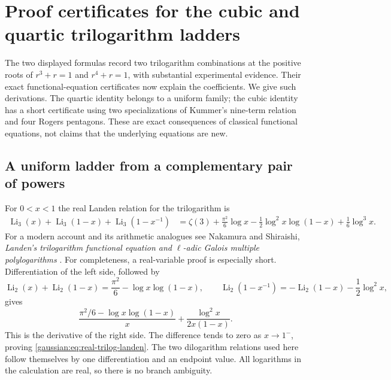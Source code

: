 
\section{Proof certificates for the cubic and quartic trilogarithm ladders}
\label{gaussian:sec:proved-small-ladders}

The two displayed formulas record two trilogarithm combinations
at the positive roots of $r^3+r=1$ and $r^4+r=1$, with substantial experimental evidence. Their exact functional-equation
certificates now explain the coefficients.
We give such derivations. The quartic identity belongs to a uniform
family; the cubic identity has a short certificate using two
specializations of Kummer's nine-term relation and four Rogers pentagons.
These are exact consequences of classical functional equations, not
claims that the underlying equations are new.

\subsection{A uniform ladder from a complementary pair of powers}

For $0<x<1$ the real Landen relation for the trilogarithm is
\begin{align}
\operatorname{Li}_3(x)+\operatorname{Li}_3(1-x)
 +\operatorname{Li}_3(1-x^{-1})
 &=\zeta(3)+\frac{\pi^2}{6}\log x
 -\frac12\log^2x\log(1-x)+\frac16\log^3x.
\label{gaussian:eq:real-trilog-landen}
\end{align}
For a modern account and its arithmetic analogues see
Nakamura and Shiraishi, \emph{Landen's trilogarithm functional equation
and $\ell$-adic Galois multiple polylogarithms} \cite{gaussian:NakamuraShiraishi}.
For completeness, a real-variable proof is especially short.
Differentiation of the left side, followed by
\[
\operatorname{Li}_2(x)+\operatorname{Li}_2(1-x)
 =\frac{\pi^2}{6}-\log x\log(1-x),\qquad
\operatorname{Li}_2(1-x^{-1})
 =-\operatorname{Li}_2(1-x)-\frac12\log^2x,
\]
gives
\[
\frac{\pi^2/6-\log x\log(1-x)}{x}
  +\frac{\log^2x}{2x(1-x)}.
\]
This is the derivative of the right side. The difference tends to zero
as $x\to1^-$, proving \eqref{gaussian:eq:real-trilog-landen}. The two dilogarithm
relations used here follow themselves by one differentiation and an
endpoint value. All logarithms in the calculation are real, so there
is no branch ambiguity.

